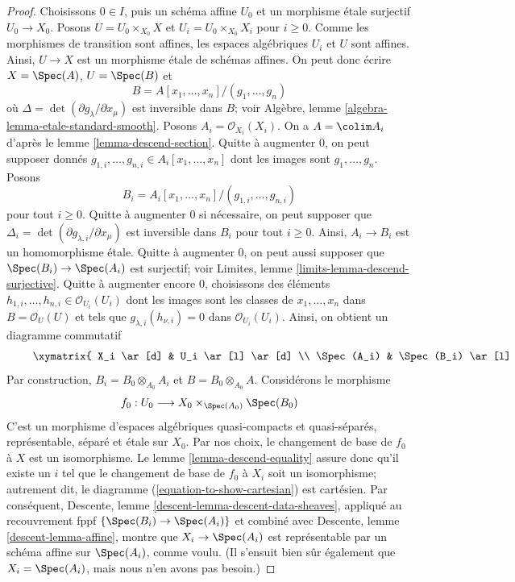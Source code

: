 \begin{proof}
Choisissons $0 \in I$, puis un schéma affine $U_0$ et un morphisme
étale surjectif $U_0 \to X_0$. Posons $U = U_0 \times_{X_0} X$
et $U_i = U_0 \times_{X_0} X_i$ pour $i \geq 0$. Comme les morphismes de transition
sont affines, les espaces algébriques $U_i$ et $U$ sont affines.
Ainsi, $U \to X$ est un morphisme étale de schémas affines. On peut donc
écrire $X = \Spec(A)$, $U = \Spec(B)$ et
$$
B = A[x_1, \ldots, x_n]/(g_1, \ldots, g_n)
$$
où $\Delta = \det(\partial g_\lambda/\partial x_\mu)$ est inversible
dans $B$; voir Algèbre, lemme \ref{algebra-lemma-etale-standard-smooth}.
Posons $A_i = \mathcal{O}_{X_i}(X_i)$. On a $A = \colim A_i$ d'après le
lemme \ref{lemma-descend-section}. Quitte à augmenter $0$, on peut supposer
donnés $g_{1, i}, \ldots, g_{n, i} \in A_i[x_1, \ldots, x_n]$ dont les images sont
$g_1, \ldots, g_n$. Posons
$$
B_i = A_i[x_1, \ldots, x_n]/(g_{1, i}, \ldots, g_{n, i})
$$
pour tout $i \geq 0$. Quitte à augmenter $0$ si nécessaire, on peut supposer que
$\Delta_i = \det(\partial g_{\lambda, i}/\partial x_\mu)$ est inversible
dans $B_i$ pour tout $i \geq 0$. Ainsi, $A_i \to B_i$ est un homomorphisme étale.
Quitte à augmenter $0$, on peut aussi supposer que
$\Spec(B_i) \to \Spec(A_i)$ est surjectif; voir
Limites, lemme \ref{limits-lemma-descend-surjective}. Quitte à augmenter
encore $0$, choisissons des éléments
$h_{1, i}, \ldots, h_{n, i} \in \mathcal{O}_{U_i}(U_i)$ dont les images sont les
classes de $x_1, \ldots, x_n$ dans $B = \mathcal{O}_U(U)$ et tels que
$g_{\lambda, i}(h_{\nu, i}) = 0$ dans $\mathcal{O}_{U_i}(U_i)$. Ainsi,
on obtient un diagramme commutatif
\begin{equation}
\label{equation-to-show-cartesian}
\vcenter{
\xymatrix{
X_i \ar[d] & U_i \ar[l] \ar[d] \\
\Spec(A_i) & \Spec(B_i) \ar[l]
}
}
\end{equation}
Par construction, $B_i = B_0 \otimes_{A_0} A_i$ et
$B = B_0 \otimes_{A_0} A$. Considérons le morphisme
$$
f_0 : U_0 \longrightarrow X_0 \times_{\Spec(A_0)} \Spec(B_0)
$$
C'est un morphisme d'espaces algébriques quasi-compacts et quasi-séparés,
représentable, séparé et étale sur $X_0$. Par nos choix, le changement de base de $f_0$
à $X$ est un isomorphisme. Le lemme
\ref{lemma-descend-equality}
assure donc qu'il existe un $i$ tel que le changement de base de $f_0$
à $X_i$ soit un isomorphisme; autrement dit, le diagramme
(\ref{equation-to-show-cartesian}) est cartésien. Par conséquent,
Descente, lemme \ref{descent-lemma-descent-data-sheaves},
appliqué au recouvrement fppf $\{\Spec(B_i) \to \Spec(A_i)\}$
et combiné avec Descente, lemme \ref{descent-lemma-affine},
montre que $X_i \to \Spec(A_i)$ est représentable par un schéma
affine sur $\Spec(A_i)$, comme voulu. (Il s'ensuit bien sûr également
que $X_i = \Spec(A_i)$, mais nous n'en avons pas besoin.)
\end{proof}

